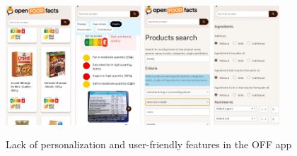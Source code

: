 \begin{figure}[H]
    \centering
    \includegraphics[width=0.22\textwidth]{images/OFF-00.png}
    \includegraphics[width=0.22\textwidth]{images/OFF-01.png}
    \includegraphics[width=0.22\textwidth]{images/OFF-02.png}
    \includegraphics[width=0.22\textwidth]{images/OFF-03.png}
    \caption{Lack of personalization and user-friendly features in the OFF app}
    \label{fig:natilait_screenshots}
\end{figure}

